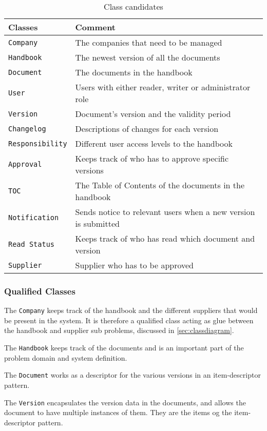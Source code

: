 \begin{table} [H]
	\centering
\begin{tabular}{l l}
	\hline
	Classes & Comment\\
	\hline
	\texttt{Company} & The companies that need to be managed \\
	\texttt{Handbook} & The newest version of all the documents\\
	\texttt{Document} & The documents in the handbook\\
	\texttt{User}& Users with either reader, writer or administrator role\\
	\texttt{Version} & Document’s version and the validity period\\
	\texttt{Changelog} & Descriptions of changes for each version\\
	\texttt{Responsibility} & Different user access levels to the handbook\\
	\texttt{Approval} & Keeps track of who has to approve specific
	versions\\
	\texttt{TOC} & The Table of Contents of the documents in the handbook\\
	\texttt{Notification} & Sends notice to relevant users when a new version is submitted\\
	\texttt{Read Status} & Keeps track of who has read which document and version\\
	\texttt{Supplier} & Supplier who has to be approved \\
	\hline
\end{tabular}
\caption{Class candidates}\label{tab:ClassCandidates}
\end{table}

\subsubsection{Qualified Classes}

The \texttt{Company} keeps track of the handbook and the different suppliers that would be present in the system.
It is therefore a qualified class acting as glue between the handbook and supplier sub problems, discussed in \cref{sec:classdiagram}.

The \texttt{Handbook} keeps track of the documents and is an important part of the problem domain and system definition.

The \texttt{Document} works as a descriptor for the various versions in an item-descriptor pattern.

The \texttt{Version} encapsulates the version data in the documents, and allows the document to have multiple instances of them.
They are the items og the item-descriptor pattern.

